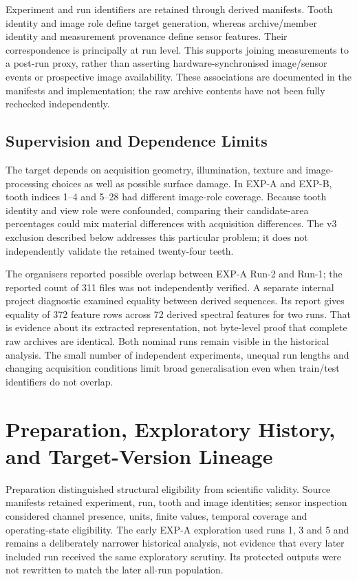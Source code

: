 Experiment and run identifiers are retained through derived manifests. Tooth identity
and image role define target generation, whereas archive/member identity and measurement
provenance define sensor features. Their correspondence is principally at run level.
This supports joining measurements to a post-run proxy, rather than asserting
hardware-synchronised image/sensor events or prospective image availability. These associations are documented in the manifests and implementation; the raw archive
contents have not been fully rechecked independently.

\subsection{Supervision and Dependence Limits}
The target depends on acquisition geometry, illumination, texture and image-processing
choices as well as possible surface damage. In EXP-A and EXP-B, tooth indices 1--4 and
5--28 had different image-role coverage. Because tooth identity and view role were
confounded, comparing their candidate-area percentages could mix material differences
with acquisition differences. The v3 exclusion described below addresses this particular
problem; it does not independently validate the retained twenty-four teeth.

The organisers reported possible overlap
between EXP-A Run-2 and Run-1; the reported count of 311 files was not independently
verified.
A separate internal project diagnostic examined equality between derived sequences.
Its report gives equality of 372 feature rows across 72 derived spectral features for
two runs. That is evidence about its extracted representation, not byte-level proof
that complete raw archives are identical. Both nominal runs remain visible in the historical
analysis. The small number of independent experiments, unequal run lengths and changing
acquisition conditions limit broad generalisation even when train/test identifiers do
not overlap.

\section{Preparation, Exploratory History, and Target-Version Lineage}
Preparation distinguished structural eligibility from scientific validity. Source
manifests retained experiment, run, tooth and image identities; sensor inspection
considered channel presence, units, finite values, temporal coverage and operating-state
eligibility. The early EXP-A exploration used runs 1, 3 and 5 and remains a deliberately
narrower historical analysis, not evidence that every later included run received the
same exploratory scrutiny. Its protected outputs were not rewritten to match the later
all-run population.

